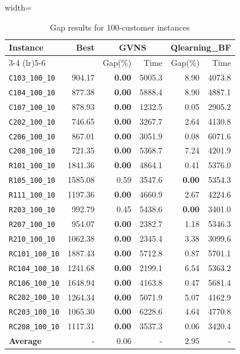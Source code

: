 \begin{table}[ht]
\centering
\small
\setlength{\tabcolsep}{5pt}
\caption{Gap results for 100-customer instances}
\vspace{4mm}
\begin{adjustbox}{width=\textwidth}
\begin{tabular}{l r r r @{\hspace{8pt}} r r @{\hspace{8pt}}}
\toprule
\multirow{2}{*}{Instance} & \multirow{2}{*}{Best} & \multicolumn{2}{c}{GVNS} & \multicolumn{2}{c}{Qlearning\_BF} \\
\cmidrule(lr){3-4} \cmidrule(lr){5-6}
 &  & Gap(\%) & Time & Gap(\%) & Time \\
\midrule
\texttt{C103\_100\_10} & 904.17 & \textbf{0.00} & 5005.3 & 8.90 & 4073.8 \\
\texttt{C104\_100\_10} & 877.38 & \textbf{0.00} & 5888.4 & 8.90 & 4887.1 \\
\texttt{C107\_100\_10} & 878.93 & \textbf{0.00} & 1232.5 & 0.05 & 2905.2 \\
\texttt{C202\_100\_10} & 746.65 & \textbf{0.00} & 3267.7 & 2.64 & 4130.8 \\
\texttt{C206\_100\_10} & 867.01 & \textbf{0.00} & 3051.9 & 0.08 & 6071.6 \\
\texttt{C208\_100\_10} & 721.35 & \textbf{0.00} & 5368.7 & 7.24 & 4201.9 \\
\texttt{R101\_100\_10} & 1841.36 & \textbf{0.00} & 4864.1 & 0.41 & 5376.0 \\
\texttt{R105\_100\_10} & 1585.08 & 0.59 & 3547.6 & \textbf{0.00} & 5354.3 \\
\texttt{R111\_100\_10} & 1197.36 & \textbf{0.00} & 4660.9 & 2.67 & 4224.6 \\
\texttt{R203\_100\_10} & 992.79 & 0.45 & 5438.6 & \textbf{0.00} & 3401.0 \\
\texttt{R207\_100\_10} & 954.07 & \textbf{0.00} & 2382.7 & 1.18 & 5346.3 \\
\texttt{R210\_100\_10} & 1062.38 & \textbf{0.00} & 2345.4 & 3.38 & 3099.6 \\
\texttt{RC101\_100\_10} & 1887.43 & \textbf{0.00} & 5712.8 & 0.87 & 5701.1 \\
\texttt{RC104\_100\_10} & 1241.68 & \textbf{0.00} & 2199.1 & 6.54 & 5363.2 \\
\texttt{RC106\_100\_10} & 1648.94 & \textbf{0.00} & 4163.8 & 0.47 & 5681.4 \\
\texttt{RC202\_100\_10} & 1264.34 & \textbf{0.00} & 5071.9 & 5.07 & 4162.9 \\
\texttt{RC203\_100\_10} & 1065.30 & \textbf{0.00} & 6228.6 & 4.64 & 4770.8 \\
\texttt{RC208\_100\_10} & 1117.31 & \textbf{0.00} & 3537.3 & 0.06 & 3420.4 \\
\midrule
\textbf{Average} & - & 0.06 & - & 2.95 & - \\
\bottomrule
\end{tabular}
\end{adjustbox}
\end{table}